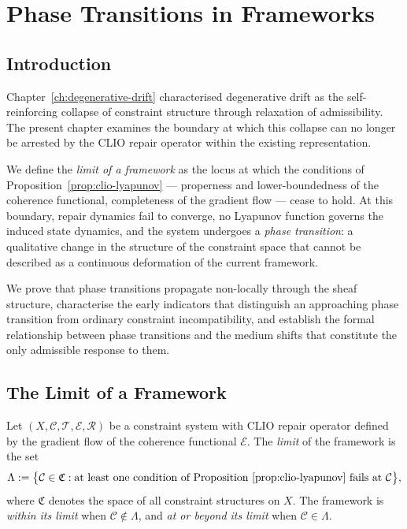 \documentclass[11pt,openany]{book}
\begin{document}

\chapter{Phase Transitions in Frameworks}
\label{ch:phase-transitions}

\section{Introduction}
\label{sec:intro-phase}

Chapter~\ref{ch:degenerative-drift} characterised
degenerative drift as the self-reinforcing collapse of
constraint structure through relaxation of admissibility.
The present chapter examines the boundary at which this
collapse can no longer be arrested by the CLIO repair
operator within the existing representation.

We define the \emph{limit of a framework} as the locus
at which the conditions of Proposition~\ref{prop:clio-lyapunov}
--- properness and lower-boundedness of the coherence
functional, completeness of the gradient flow --- cease to
hold.  At this boundary, repair dynamics fail to converge,
no Lyapunov function governs the induced state dynamics,
and the system undergoes a \emph{phase transition}: a
qualitative change in the structure of the constraint space
that cannot be described as a continuous deformation of the
current framework.

We prove that phase transitions propagate non-locally
through the sheaf structure, characterise the early
indicators that distinguish an approaching phase transition
from ordinary constraint incompatibility, and establish the
formal relationship between phase transitions and the medium
shifts that constitute the only admissible response to them.

\section{The Limit of a Framework}
\label{sec:limit}

\begin{definition}
\label{def:framework-limit}
Let $(X, \mathcal{C}, \mathcal{T}, \mathcal{E},
\mathcal{R})$ be a constraint system with CLIO repair
operator defined by the gradient flow of the coherence
functional $\mathcal{E}$.  The \emph{limit} of the
framework is the set
\[
  \Lambda := \bigl\{ \mathcal{C} \in \mathfrak{C} :
    \text{at least one condition of
    Proposition~\ref{prop:clio-lyapunov} fails at }
    \mathcal{C} \bigr\},
\]
where $\mathfrak{C}$ denotes the space of all constraint
structures on $X$.  The framework is \emph{within its
limit} when $\mathcal{C} \notin \Lambda$, and \emph{at or
beyond its limit} when $\mathcal{C} \in \Lambda$.
\end{definition}
\end{document}

